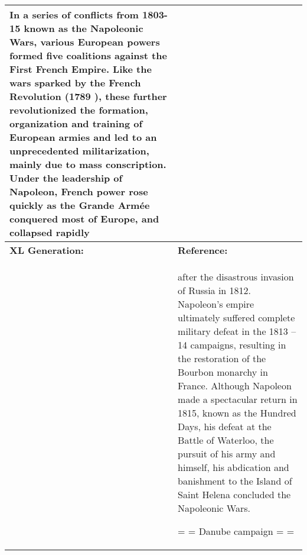 \documentclass[11pt,a4paper]{article}
\begin{document}
\begin{center}
\begin{longtable}{p{7.8cm}|p{7.8cm}}
{In a series of conflicts from 1803-15 known as the Napoleonic Wars, various European powers formed five coalitions against the First French Empire. Like the wars sparked by the French Revolution (1789 ), these further revolutionized the formation, organization and training of European armies and led to an unprecedented militarization, mainly due to mass conscription. Under the leadership of Napoleon, French power rose quickly as the Grande Armée conquered most of Europe, and collapsed rapidly 
 } \\
	\midrule
	\textbf{XL Generation:} & \textbf{Reference:} \\	
	 & after the disastrous invasion of Russia in 1812. Napoleon's empire ultimately suffered complete military defeat in the 1813 – 14 campaigns, resulting in the restoration of the Bourbon monarchy in France. Although Napoleon made a spectacular return in 1815, known as the Hundred Days, his defeat at the Battle of Waterloo, the pursuit of his army and himself, his abdication and banishment to the Island of Saint Helena concluded the Napoleonic Wars. 

= = Danube campaign = = 


\end{longtable}
\end{center}
\end{document}

